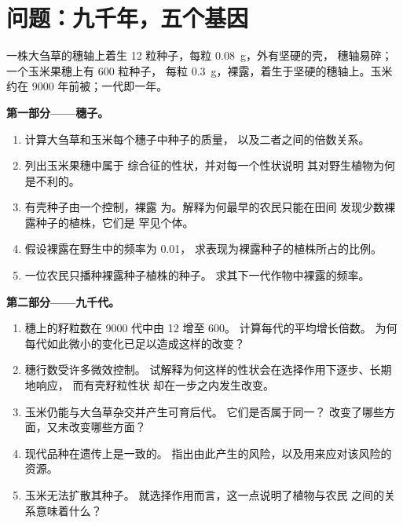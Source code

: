 \section{问题：九千年，五个基因}

\begin{problem}
\label{pb:g12:domesticated-plants:1}
一株大刍草的穗轴上着生 12 粒种子，每粒 \qty{0.08}{g}，外有坚硬的壳，
穗轴易碎；一个玉米果穗上有 600 粒种子，
每粒 \qty{0.3}{g}，裸露，着生于坚硬的穗轴上。玉米约在 9000
年前被；一代即一年。

\medskip
\noindent\textbf{第一部分——穗子。}
\begin{enumerate}
  \item 计算大刍草和玉米每个穗子中种子的质量，
        以及二者之间的倍数关系。
  \item 列出玉米果穗中属于
        综合征的性状，并对每一个性状说明
        其对野生植物为何是不利的。
  \item 有壳种子由一个控制，裸露
        为。解释为何最早的农民只能在田间
        发现少数裸露种子的植株，它们是
        罕见个体。
  \item 假设裸露在野生中的频率为 0.01，
        求表现为裸露种子的植株所占的比例。
  \item 一位农民只播种裸露种子植株的种子。
        求其下一代作物中裸露的频率。
\end{enumerate}

\medskip
\noindent\textbf{第二部分——九千代。}
\begin{enumerate}[resume]
  \item 穗上的籽粒数在 9000 代中由 12 增至 600。
        计算每代的平均增长倍数。
        为何每代如此微小的变化已足以造成这样的改变？
  \item 穗行数受许多微效控制。
        试解释为何这样的性状会在选择作用下逐步、长期地响应，
        而有壳籽粒性状
        却在一步之内发生改变。
  \item 玉米仍能与大刍草杂交并产生可育后代。
        它们是否属于同一？
        改变了哪些方面，又未改变哪些方面？
  \item 现代品种在遗传上是一致的。
        指出由此产生的风险，以及用来应对该风险的资源。
  \item 玉米无法扩散其种子。
        就选择作用而言，这一点说明了植物与农民
        之间的关系意味着什么？
\end{enumerate}


\end{problem}
